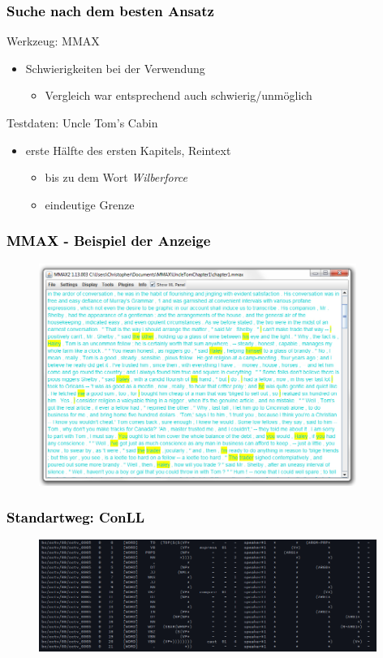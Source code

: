 \documentclass[xcolor=dvipsnames]{beamer}
\begin{document}
\begin{frame}\frametitle{\textcolor{black}{Suche nach dem besten Ansatz}}

\begin{block}{Werkzeug: MMAX}
\begin{itemize}
\item Schwierigkeiten bei der Verwendung
\begin{itemize}
\item Vergleich war entsprechend auch schwierig/unmöglich
\end{itemize}
\end{itemize}
\end{block}

\begin{block}{Testdaten: Uncle Tom's Cabin}
\begin{itemize}
\item erste Hälfte des ersten Kapitels, Reintext
\begin{itemize}
\item bis zu dem Wort \emph{Wilberforce}
\item eindeutige Grenze
\end{itemize}
\end{itemize}
\end{block}

\end{frame}


\begin{frame}\frametitle{\textcolor{black}{{MMAX - Beispiel der Anzeige}}}
\begin{figure}
\includegraphics[height=7.25cm]{img/cm_mmax.jpg}
\end{figure}

\end{frame}

\begin{frame}\frametitle{\textcolor{black}{{Standartweg: ConLL}}}
\begin{figure}
  \includegraphics[width=11cm]{img/conll.png}
\end{figure}

\end{frame}
\end{document}
